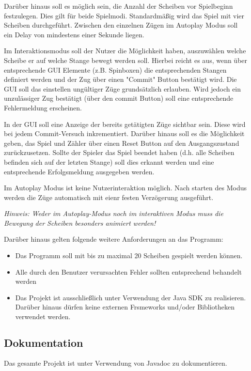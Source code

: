 \documentclass[a4paper,
			   fontsize=12pt]{article}
\begin{document}
Darüber hinaus soll es möglich sein, die Anzahl der Scheiben vor Spielbeginn festzulegen. Dies gilt für beide Spielmodi. Standardmäßig
wird das Spiel mit vier Scheiben durchgeführt. Zwischen den einzelnen Zügen im Autoplay Modus soll ein Delay von mindestens einer Sekunde
liegen.

Im Interaktionsmodus soll der Nutzer die Möglichkeit haben, auszuwählen welche Scheibe er auf welche Stange bewegt werden soll. Hierbei reicht es aus, wenn über entsprechende 
GUI Elemente (z.B. Spinboxen) die entsprechenden Stangen definiert werden und der Zug über einen "Commit" Button bestätigt wird. Die GUI soll das einstellen ungültiger Züge
grundsätzlich erlauben. Wird jedoch ein unzulässiger Zug bestätigt (über den commit Button) soll eine entsprechende Fehlermeldung erscheinen.

In der GUI soll eine Anzeige der bereits getätigten Züge sichtbar sein. Diese wird bei jedem Commit-Versuch inkrementiert. Darüber hinaus soll es die Möglichkeit geben,
das Spiel und Zähler über einen Reset Button auf den Ausgangszustand zurückzusetzen. Sollte der Spieler das Spiel beendet haben (d.h. alle Scheiben befinden sich auf
der letzten Stange) soll dies erkannt werden und eine entsprechende Erfolgsmeldung ausgegeben werden.

Im Autoplay Modus ist keine Nutzerinteraktion möglich. Nach starten des Modus werden die Züge automatisch mit eienr festen Verzögerung ausgeführt.

\textit{Hinweis: Weder im Autoplay-Modus noch im interaktiven Modus muss die Bewegung der Scheiben besonders animiert werden!}

Darüber hinaus gelten folgende weitere Anforderungen an das Programm:
\begin{itemize}
	\item Das Programm soll mit bis zu maximal 20 Scheiben gespielt werden können.
	\item Alle durch den Benutzer verursachten Fehler sollten entsprechend behandelt werden
	\item Das Projekt ist ausschließlich unter Verwendung der Java SDK zu realisieren. Darüber hinaus dürfen keine externen Frsmeworks und/oder Bibliotheken verwendet werden.
\end{itemize}

\subsection*{Dokumentation}
Das gesamte Projekt ist unter Verwendung von Javadoc zu dokumentieren.
\end{document}
